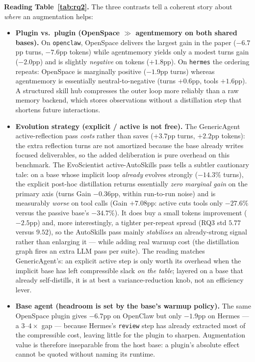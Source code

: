 \documentclass{article}
\begin{document}
\textbf{Reading Table~\ref{tab:rq2}.} The three contrasts tell a coherent story about \emph{where} an augmentation helps:
\begin{itemize}
\item \textbf{Plugin vs.\ plugin (OpenSpace $\gg$ agentmemory on both shared bases).} On \texttt{openclaw}, OpenSpace delivers the largest gain in the paper ($-6.7$pp turns, $-7.6$pp tokens) while agentmemory yields only a modest turns gain ($-2.0$pp) and is slightly \emph{negative} on tokens ($+1.8$pp). On \texttt{hermes} the ordering repeats: OpenSpace is marginally positive ($-1.9$pp turns) whereas agentmemory is essentially neutral-to-negative (turns $+0.6$pp, tools $+1.6$pp). A structured skill hub compresses the outer loop more reliably than a raw memory backend, which stores observations without a distillation step that shortens future interactions.
\item \textbf{Evolution strategy (explicit / active is not free).} The GenericAgent active-reflection pass \emph{costs} rather than saves ($+3.7$pp turns, $+2.2$pp tokens): the extra reflection turns are not amortized because the base already writes focused deliverables, so the added deliberation is pure overhead on this benchmark. The EvoScientist active-AutoSkills pass tells a subtler cautionary tale: on a base whose implicit loop \emph{already} evolves strongly ($-14.3\%$ turns), the explicit post-hoc distillation returns essentially \emph{zero marginal gain} on the primary axis (turns Gain $-0.36$pp, within run-to-run noise) and is measurably \emph{worse} on tool calls (Gain $+7.08$pp: active cuts tools only $-27.6\%$ versus the passive base's $-34.7\%$). It does buy a small tokens improvement ($-2.5$pp) and, more interestingly, a tighter per-repeat spread (RQ3 std $5.77$ versus $9.52$), so the AutoSkills pass mainly \emph{stabilises} an already-strong signal rather than enlarging it --- while adding real warmup cost (the distillation graph fires an extra LLM pass per suite). The reading matches GenericAgent's: an explicit active step is only worth its overhead when the implicit base has left compressible slack \emph{on the table}; layered on a base that already self-distills, it is at best a variance-reduction knob, not an efficiency lever.
\item \textbf{Base agent (headroom is set by the base's warmup policy).} The same OpenSpace plugin gives $-6.7$pp on OpenClaw but only $-1.9$pp on Hermes --- a $3$--$4\times$ gap --- because Hermes's \texttt{review} step has already extracted most of the compressible cost, leaving little for the plugin to sharpen. Augmentation value is therefore inseparable from the host base: a plugin's absolute effect cannot be quoted without naming its runtime.
\end{itemize}
\end{document}
